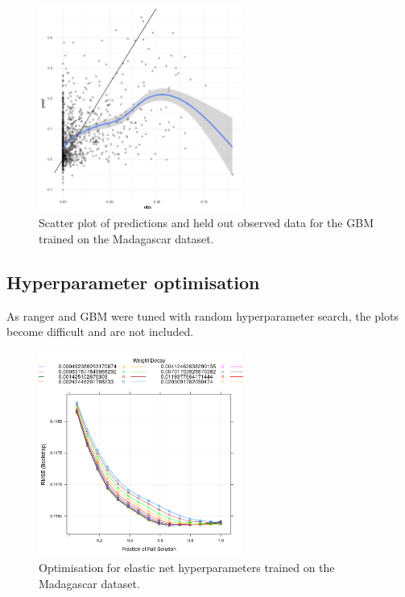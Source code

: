 \documentclass[review]{elsarticle}
\begin{document}
\begin{figure}[h!]
  \centering
  \includegraphics[width=0.6\textwidth]{figs/SI/xgboost_obspred_mdg.png}
\caption{
  Scatter plot of predictions and held out observed data for the GBM trained on the Madagascar dataset.
}

\end{figure}


\clearpage
\subsection{Hyperparameter optimisation}

As ranger and GBM were tuned with random hyperparameter search, the plots become difficult and are not included.


\begin{figure}[h!]
  \centering
  \includegraphics[width=0.6\textwidth]{figs/SI/enetopt_mdg.png}
\caption{
  Optimisation for elastic net hyperparameters trained on the Madagascar dataset.
}
\end{figure}
\end{document}
